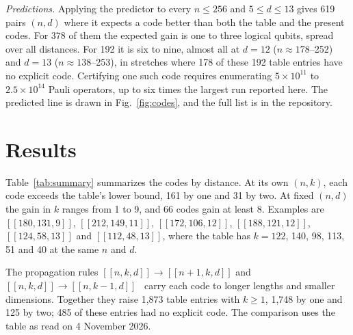 \documentclass[reprint,pra,superscriptaddress,nofootinbib]{revtex4-2}
\begin{document}
\emph{Predictions.} Applying the predictor to every $n\le256$ and $5\le d\le13$ gives 619 pairs $(n,d)$ where it
expects a code better than both the table and the present codes. For 378 of them the expected gain is one to three
logical qubits, spread over all distances. For 192 it is six to nine, almost all at $d=12$ ($n\approx178$--252) and
$d=13$ ($n\approx138$--253), in stretches where 178 of these 192 table entries have no explicit code. Certifying one
such code requires enumerating $5\times10^{11}$ to $2.5\times10^{14}$ Pauli operators, up to six times the largest run
reported here. The predicted line is drawn in Fig.~\ref{fig:codes}, and the full list is in the repository.

\section{Results}\label{sec:results}

Table~\ref{tab:summary} summarizes the codes by distance. At its own $(n,k)$, each code exceeds the table's lower bound,
161 by one and 31 by two. At fixed $(n,d)$ the gain in $k$ ranges from 1 to 9, and 66 codes gain at least 8. Examples
are $[[180,131,9]]$, $[[212,149,11]]$, $[[172,106,12]]$, $[[188,121,12]]$, $[[124,58,13]]$ and $[[112,48,13]]$, where
the table has $k=122$, 140, 98, 113, 51 and 40 at the same $n$ and $d$.

The propagation rules $[[n,k,d]]\to[[n+1,k,d]]$ and $[[n,k,d]]\to[[n,k-1,d]]$~\cite{crss} carry each code to longer
lengths and smaller dimensions. Together they raise 1,873 table entries with $k\ge1$, 1,748 by one and 125 by two; 485
of these entries had no explicit code. The comparison uses the table as read on 4 November 2026.
\end{document}
